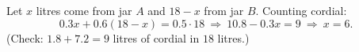 Let $x$ litres come from jar $A$ and $18-x$ from jar $B$. Counting cordial:
\[0.3x+0.6(18-x)=0.5\cdot18\ \Longrightarrow\ 10.8-0.3x=9\ \Longrightarrow\ x=\boxed{6}.\]
(Check: $1.8+7.2=9$ litres of cordial in $18$ litres.)
